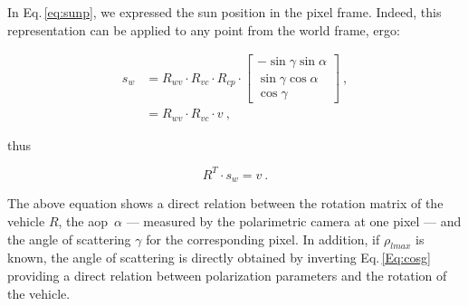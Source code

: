 In Eq.\,\eqref{eq:sunp}, we expressed the sun position in the pixel frame. Indeed,
this representation can be applied to any point from the world frame, ergo:

\begin{equation}
  \label{eq:Rwv}
  \begin{split}
    s_{w} & = R_{wv} \cdot R_{vc} \cdot R_{cp} \cdot
    \begin{bmatrix}
    -\sin\gamma \sin\alpha\\
    \sin\gamma \cos\alpha\\
    \cos\gamma
  \end{bmatrix} \ , \\
  &= R_{wv} \cdot R_{vc} \cdot v \ ,
  \end{split}
\end{equation}

\noindent thus

\begin{equation}
  R^{T} \cdot s_{w}  = v \ .
\end{equation}

The above equation shows a direct relation between the rotation matrix of the
vehicle $R$, the \gls{aop}~$\alpha$ --- measured by the polarimetric camera at
one pixel --- and the angle of scattering $\gamma$ for the corresponding
pixel. In addition, if $\rho_{lmax}$ is known, the angle of scattering is
directly obtained by inverting Eq.\,\eqref{Eq:cosg} providing a direct relation
between polarization parameters and the rotation of the vehicle.

